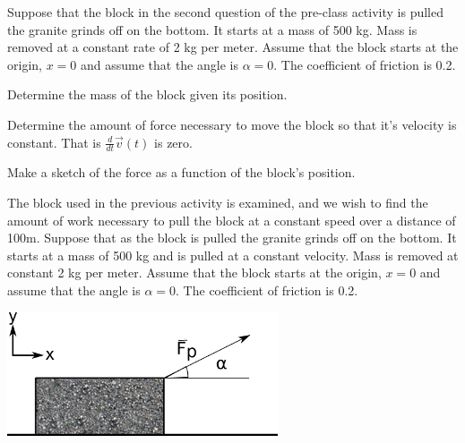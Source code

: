 \begin{problem}
\begin{subproblem}
      \vfill

%
      \vfill

%

  \end{subproblem}


\end{problem}


\begin{problem}
\item Suppose that the block in the second question of the pre-class activity is pulled the
  granite grinds off on the bottom. It starts at a mass of 500
  kg. Mass is removed at a constant rate of 2 kg  per meter. Assume
  that the block starts at the origin, $x=0$ and assume that the angle
  is $\alpha=0$. The coefficient of friction is 0.2.

  \begin{subproblem}
  \item Determine the mass of the block given its position.
    \vfill
  \item Determine the amount of force necessary to move the block so
    that it's velocity is constant. That is
    $\frac{d}{dt} \vec{v}(t)$ is zero.
    \vfill
  \item Make a sketch of the force as a function of the block's
    position.

    \vfill
  \end{subproblem}

\clearpage

\item The block used in the previous activity is examined, and we wish
  to find the amount of work necessary to pull the block at a constant
  speed over a distance of 100m.  Suppose that as the block is pulled
  the granite grinds off on the bottom. It starts at a mass of 500 kg
  and is pulled at a constant velocity. Mass is removed at constant 2 kg per
  meter. Assume that the block starts at the origin, $x=0$ and assume
  that the angle is $\alpha=0$. The coefficient of friction is 0.2.

  \includegraphics[width=8cm]{ink/week7/dragBlock}


\end{problem}
